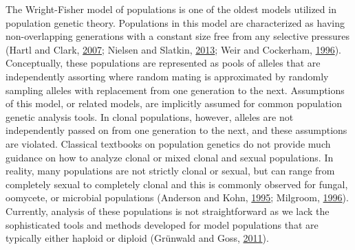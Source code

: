 \documentclass[double,12pt]{beavtex}
\begin{document}
  The Wright-Fisher model of populations is one of the oldest models
  utilized in population genetic theory. Populations in this model are
  characterized as having non-overlapping generations with a constant size
  free from any selective pressures (Hartl and Clark,
  \protect\hyperlink{ref-hartl1997principles}{2007}; Nielsen and Slatkin,
  \protect\hyperlink{ref-nielsen2013introduction}{2013}; Weir and
  Cockerham, \protect\hyperlink{ref-weir1996genetic}{1996}). Conceptually,
  these populations are represented as pools of alleles that are
  independently assorting where random mating is approximated by randomly
  sampling alleles with replacement from one generation to the next.
  Assumptions of this model, or related models, are implicitly assumed for
  common population genetic analysis tools. In clonal populations,
  however, alleles are not independently passed on from one generation to
  the next, and these assumptions are violated. Classical textbooks on
  population genetics do not provide much guidance on how to analyze
  clonal or mixed clonal and sexual populations. In reality, many
  populations are not strictly clonal or sexual, but can range from
  completely sexual to completely clonal and this is commonly observed for
  fungal, oomycete, or microbial populations (Anderson and Kohn,
  \protect\hyperlink{ref-anderson1995clonality}{1995}; Milgroom,
  \protect\hyperlink{ref-milgroom1996recombination}{1996}). Currently,
  analysis of these populations is not straightforward as we lack the
  sophisticated tools and methods developed for model populations that are
  typically either haploid or diploid (Grünwald and Goss,
  \protect\hyperlink{ref-grunwald2011evolution}{2011}).
  
\end{document}
